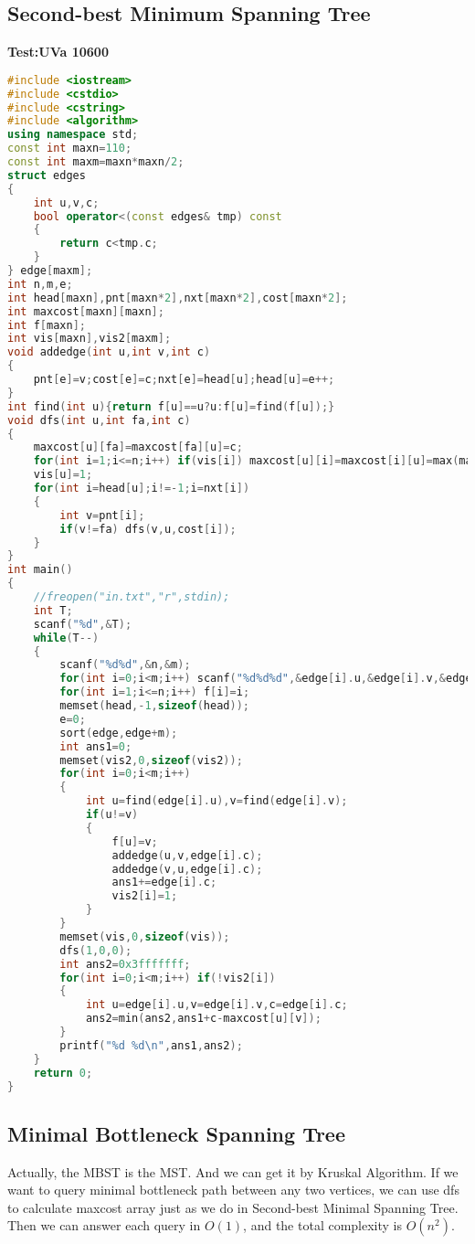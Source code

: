   \subsection{Second-best Minimum Spanning Tree}
  \textbf{Test:UVa 10600}
  \begin{lstlisting}[language=C++]
#include <iostream>
#include <cstdio>
#include <cstring>
#include <algorithm>
using namespace std;
const int maxn=110;
const int maxm=maxn*maxn/2;
struct edges
{
	int u,v,c;
	bool operator<(const edges& tmp) const
	{
		return c<tmp.c;
	}
} edge[maxm];
int n,m,e;
int head[maxn],pnt[maxn*2],nxt[maxn*2],cost[maxn*2];
int maxcost[maxn][maxn];
int f[maxn];
int vis[maxn],vis2[maxm];
void addedge(int u,int v,int c)
{
	pnt[e]=v;cost[e]=c;nxt[e]=head[u];head[u]=e++;
}
int find(int u){return f[u]==u?u:f[u]=find(f[u]);}
void dfs(int u,int fa,int c)
{
	maxcost[u][fa]=maxcost[fa][u]=c;
	for(int i=1;i<=n;i++) if(vis[i]) maxcost[u][i]=maxcost[i][u]=max(maxcost[i][fa],c);
	vis[u]=1;
	for(int i=head[u];i!=-1;i=nxt[i])
	{
		int v=pnt[i];
		if(v!=fa) dfs(v,u,cost[i]);
	}
}
int main()
{
	//freopen("in.txt","r",stdin);
	int T;
	scanf("%d",&T);
	while(T--)
	{
		scanf("%d%d",&n,&m);
		for(int i=0;i<m;i++) scanf("%d%d%d",&edge[i].u,&edge[i].v,&edge[i].c);
		for(int i=1;i<=n;i++) f[i]=i;
		memset(head,-1,sizeof(head));
		e=0;
		sort(edge,edge+m);
		int ans1=0;
		memset(vis2,0,sizeof(vis2));
		for(int i=0;i<m;i++)
		{
			int u=find(edge[i].u),v=find(edge[i].v);
			if(u!=v)
			{
				f[u]=v;
				addedge(u,v,edge[i].c);
				addedge(v,u,edge[i].c);
				ans1+=edge[i].c;
				vis2[i]=1;
			}
		}
		memset(vis,0,sizeof(vis));
		dfs(1,0,0);
		int ans2=0x3fffffff;
		for(int i=0;i<m;i++) if(!vis2[i])
		{
			int u=edge[i].u,v=edge[i].v,c=edge[i].c;
			ans2=min(ans2,ans1+c-maxcost[u][v]);
		}
		printf("%d %d\n",ans1,ans2);
	}
	return 0;
}
  \end{lstlisting}
  \subsection{Minimal Bottleneck Spanning Tree}
Actually, the MBST is the MST. And we can get it by Kruskal Algorithm. If we want to query minimal bottleneck path between any two vertices, we can use dfs to calculate maxcost array just as we do in Second-best Minimal Spanning Tree. Then we can answer each query in $O(1)$, and the total complexity is $O(n^2)$.
